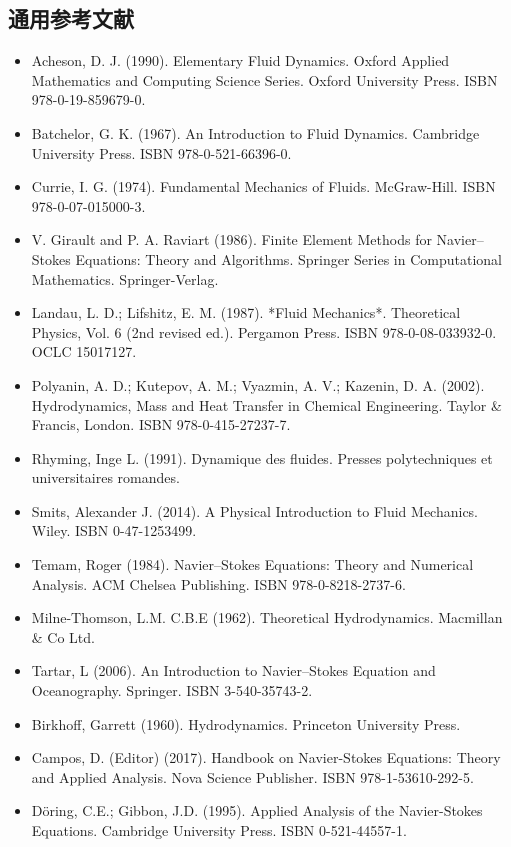 \subsection{通用参考文献}
\begin{itemize}
\item Acheson, D. J. (1990). Elementary Fluid Dynamics. Oxford Applied Mathematics and Computing Science Series. Oxford University Press. ISBN 978-0-19-859679-0.
\item Batchelor, G. K. (1967). An Introduction to Fluid Dynamics. Cambridge University Press. ISBN 978-0-521-66396-0.
\item Currie, I. G. (1974). Fundamental Mechanics of Fluids. McGraw-Hill. ISBN 978-0-07-015000-3.
\item V. Girault and P. A. Raviart (1986). Finite Element Methods for Navier–Stokes Equations: Theory and Algorithms. Springer Series in Computational Mathematics. Springer-Verlag.
\item Landau, L. D.; Lifshitz, E. M. (1987). *Fluid Mechanics*. Theoretical Physics, Vol. 6 (2nd revised ed.). Pergamon Press. ISBN 978-0-08-033932-0. OCLC 15017127.
\item Polyanin, A. D.; Kutepov, A. M.; Vyazmin, A. V.; Kazenin, D. A. (2002). Hydrodynamics, Mass and Heat Transfer in Chemical Engineering. Taylor & Francis, London. ISBN 978-0-415-27237-7.
\item Rhyming, Inge L. (1991). Dynamique des fluides. Presses polytechniques et universitaires romandes.
\item Smits, Alexander J. (2014). A Physical Introduction to Fluid Mechanics. Wiley. ISBN 0-47-1253499.
\item Temam, Roger (1984). Navier–Stokes Equations: Theory and Numerical Analysis. ACM Chelsea Publishing. ISBN 978-0-8218-2737-6.
\item Milne-Thomson, L.M. C.B.E (1962). Theoretical Hydrodynamics. Macmillan & Co Ltd.
\item Tartar, L (2006). An Introduction to Navier–Stokes Equation and Oceanography. Springer. ISBN 3-540-35743-2.
\item Birkhoff, Garrett (1960). Hydrodynamics. Princeton University Press.
\item Campos, D. (Editor) (2017). Handbook on Navier-Stokes Equations: Theory and Applied Analysis. Nova Science Publisher. ISBN 978-1-53610-292-5.
\item Döring, C.E.; Gibbon, J.D. (1995). Applied Analysis of the Navier-Stokes Equations. Cambridge University Press. ISBN 0-521-44557-1.

\end{itemize}
